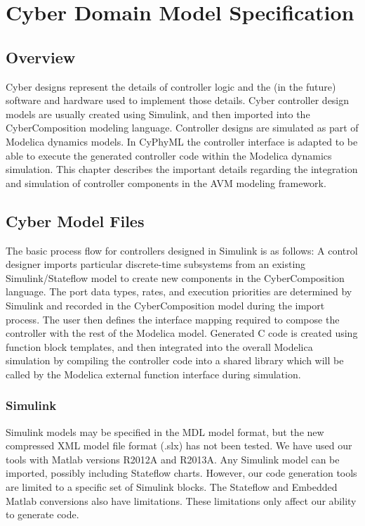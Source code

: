 \section{Cyber Domain Model Specification}

\subsection{Overview}

Cyber designs represent the details of controller logic and the (in the future) software and hardware used to 
implement those details.  Cyber controller design models are usually created using Simulink, and then imported 
into the CyberComposition modeling language.  Controller designs are simulated as part of Modelica dynamics models.
In CyPhyML the controller interface is adapted to be able to execute the generated controller code within the
Modelica dynamics simulation.  This chapter describes the important details regarding the integration and simulation of controller components in the AVM modeling framework.


\subsection{Cyber Model Files}

The basic process flow for controllers designed in Simulink is as follows:  A control designer imports particular discrete-time subsystems from an existing Simulink/Stateflow model to create new components in the CyberComposition language.  The port data types, rates, and execution priorities are determined by Simulink and recorded in the CyberComposition model during the import process.  The user then defines the interface mapping required to compose the controller with the rest of the Modelica model. Generated C code is created using function block templates, and then integrated into the overall Modelica simulation by compiling the controller code into a shared library which will be called by the Modelica external function interface during simulation.

\subsubsection{Simulink}

Simulink models may be specified in the MDL model format, but the new compressed XML model file format (.slx) has
not been tested.  We have used our tools with Matlab versions R2012A and R2013A.  Any Simulink model can be 
imported, possibly including Stateflow charts.  However, our code generation tools are limited to a specific set
of Simulink blocks.  The Stateflow and Embedded Matlab conversions also have limitations.   These limitations only
affect our ability to generate code.

